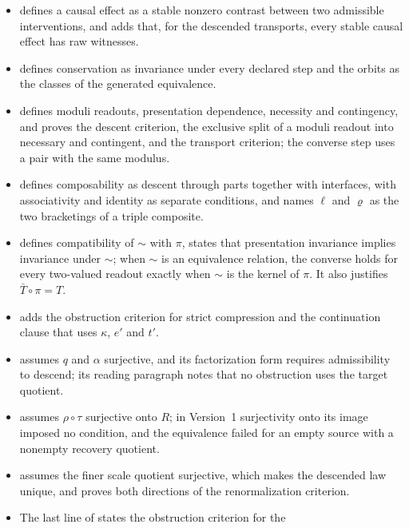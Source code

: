\begin{itemize}
  as declared statuses. It adds that \(q_s\) is coarsest in the factorization preorder among maps through which \(q\) and \(s\) both factor. Its corestriction to its image is the coarsest surjective quotient with that property.
\item {} defines a causal effect as a stable nonzero contrast
  between two admissible interventions, and adds that, for the descended
  transports, every stable causal effect has raw witnesses.
\item {} defines conservation as invariance under every declared
  step and the orbits as the classes of the generated equivalence.
\item {} defines moduli readouts, presentation dependence,
  necessity and contingency, and proves the descent criterion, the exclusive
  split of a moduli readout into necessary and contingent, and the transport
  criterion; the converse step uses a pair with the same modulus.
\item {} defines composability as descent through parts together
  with interfaces, with associativity and identity as separate conditions,
  and names \(\ell\) and \(\varrho\) as the two bracketings of a triple
  composite.
\item {} defines compatibility of \(\sim\) with \(\pi\), states that
  presentation invariance implies invariance under \(\sim\); when
  \(\sim\) is an equivalence relation, the converse holds for every
  two-valued readout exactly when \(\sim\) is the kernel of \(\pi\).
  It also justifies \(\bar T\circ\pi=T\).
\item {} adds the obstruction criterion for strict compression
  and the continuation clause that uses \(\kappa\), \(e'\) and \(t'\).
\item {} assumes \(q\) and \(\alpha\) surjective, and its
  factorization form requires admissibility to descend; its reading paragraph
  notes that no obstruction uses the target quotient.
\item {} assumes \(\rho\circ\tau\) surjective onto \(R\); in
  Version~1 surjectivity onto its image imposed no condition, and the
  equivalence failed for an empty source with a nonempty recovery quotient.
\item {} assumes the finer scale quotient surjective, which makes
  the descended law unique, and proves both directions of the renormalization
  criterion.
\item The last line of  states the obstruction criterion for the

\end{itemize}
